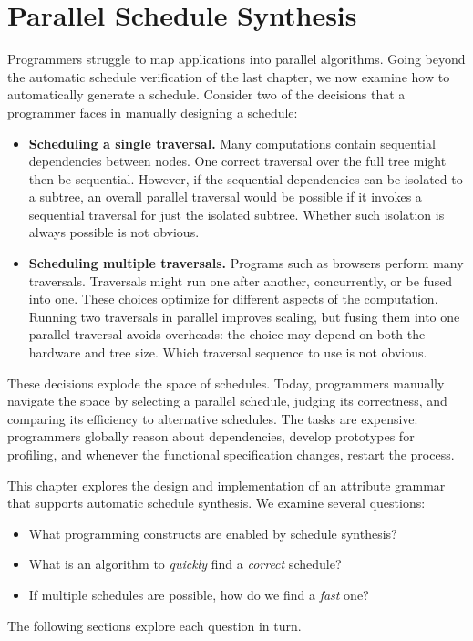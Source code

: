 \chapter{Parallel Schedule Synthesis}
\label{chap:4}


Programmers struggle to map applications into parallel algorithms. Going beyond the automatic schedule verification of the last chapter, we now examine how to automatically generate a schedule.  Consider two of the decisions that a programmer faces in manually designing a schedule:
\begin{itemize}
\item \textbf{Scheduling a single traversal.} Many computations contain sequential dependencies between nodes. One correct traversal over the full tree might then be sequential. However, if the sequential dependencies can be isolated to a subtree, an overall parallel traversal would be possible if it invokes a sequential traversal for just the isolated subtree. Whether such isolation is always possible is not obvious.
\item \textbf{Scheduling multiple traversals.} Programs such as browsers perform many traversals. Traversals might run one after another, concurrently, or be fused into one. These choices optimize for different aspects of the computation. Running two traversals in parallel improves scaling, but fusing them into one parallel traversal avoids overheads: the choice may depend on both the hardware and tree size. Which traversal sequence to use is not obvious.
\end{itemize}
These decisions explode the space of schedules. Today, programmers manually navigate the space by selecting a parallel schedule, judging its correctness,  and comparing its efficiency to alternative schedules. The tasks are expensive: programmers  globally reason about dependencies, develop prototypes for profiling, and whenever the functional specification changes, restart the process. 

This chapter explores the design and implementation of an attribute grammar that supports automatic schedule synthesis.
We examine several questions: 
\begin{itemize}
\item What programming constructs are enabled by schedule synthesis?
\item What is an algorithm to \emph{quickly} find a \emph{correct} schedule?
\item If multiple schedules are possible, how do we find a \emph{fast} one?
\end{itemize}
The following sections explore each question in turn. 



